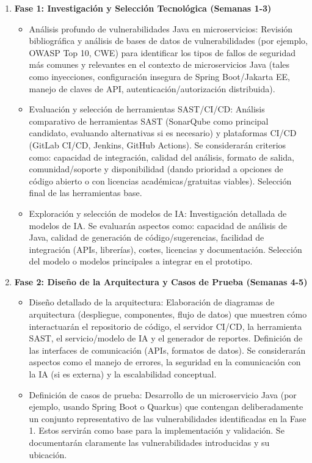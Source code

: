\begin{enumerate}
    \item \textbf{Fase 1: Investigación y Selección Tecnológica (Semanas 1-3)}
    \begin{itemize}
        \item Análisis profundo de vulnerabilidades Java en microservicios: Revisión bibliográfica y análisis de bases de datos de vulnerabilidades (por ejemplo, OWASP Top 10, CWE) para identificar los tipos de fallos de seguridad más comunes y relevantes en el contexto de microservicios Java (tales como inyecciones, configuración insegura de Spring Boot/Jakarta EE, manejo de claves de API, autenticación/autorización distribuida).
        \item Evaluación y selección de herramientas SAST/CI/CD: Análisis comparativo de herramientas SAST (SonarQube como principal candidato, evaluando alternativas si es necesario) y plataformas CI/CD (GitLab CI/CD, Jenkins, GitHub Actions). Se considerarán criterios como: capacidad de integración, calidad del análisis, formato de salida, comunidad/soporte y disponibilidad (dando prioridad a opciones de código abierto o con licencias académicas/gratuitas viables). Selección final de las herramientas base.
        \item Exploración y selección de modelos de IA: Investigación detallada de modelos de IA. Se evaluarán aspectos como: capacidad de análisis de Java, calidad de generación de código/sugerencias, facilidad de integración (APIs, librerías), costes, licencias y documentación. Selección del modelo o modelos principales a integrar en el prototipo.
    \end{itemize}
    
    \item \textbf{Fase 2: Diseño de la Arquitectura y Casos de Prueba (Semanas 4-5)}
    \begin{itemize}
        \item Diseño detallado de la arquitectura: Elaboración de diagramas de arquitectura (despliegue, componentes, flujo de datos) que muestren cómo interactuarán el repositorio de código, el servidor CI/CD, la herramienta SAST, el servicio/modelo de IA y el generador de reportes. Definición de las interfaces de comunicación (APIs, formatos de datos). Se considerarán aspectos como el manejo de errores, la seguridad en la comunicación con la IA (si es externa) y la escalabilidad conceptual.
        \item Definición de casos de prueba: Desarrollo de un microservicio Java (por ejemplo, usando Spring Boot o Quarkus) que contengan deliberadamente un conjunto representativo de las vulnerabilidades identificadas en la Fase 1. Estos servirán como base para la implementación y validación. Se documentarán claramente las vulnerabilidades introducidas y su ubicación.
    \end{itemize}
    

\end{enumerate}
